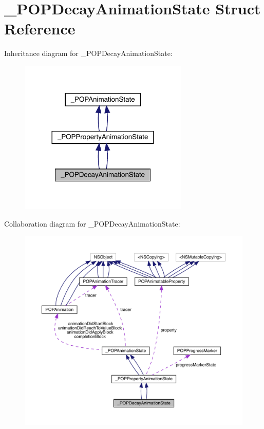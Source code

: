 \hypertarget{struct___p_o_p_decay_animation_state}{}\section{\+\_\+\+P\+O\+P\+Decay\+Animation\+State Struct Reference}
\label{struct___p_o_p_decay_animation_state}


Inheritance diagram for \+\_\+\+P\+O\+P\+Decay\+Animation\+State\+:\nopagebreak
\begin{figure}[H]
\begin{center}
\leavevmode
\includegraphics[width=228pt]{struct___p_o_p_decay_animation_state__inherit__graph}
\end{center}
\end{figure}


Collaboration diagram for \+\_\+\+P\+O\+P\+Decay\+Animation\+State\+:\nopagebreak
\begin{figure}[H]
\begin{center}
\leavevmode
\includegraphics[width=350pt]{struct___p_o_p_decay_animation_state__coll__graph}
\end{center}
\end{figure}
